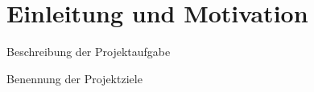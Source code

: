 \chapter{Einleitung und Motivation}
\label{introduction-and-motivation}

Beschreibung der Projektaufgabe

Benennung der Projektziele
